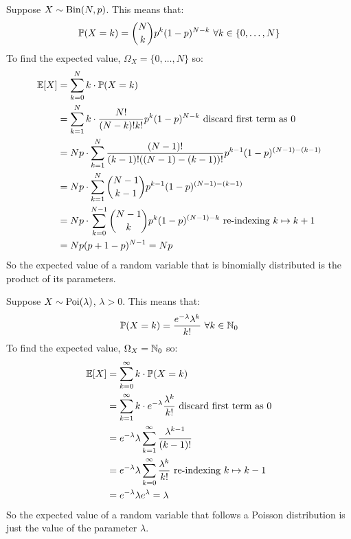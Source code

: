 \documentclass[../main.tex]{subfiles}
\begin{document}
\begin{example}
  \label{binomialExpectation}
  Suppose $X \sim \binomial(N, p)$.
  This means that:
  \[
    \P(X = k) = \binom{N}{k}p^{k}(1-p)^{N-k}\ \forall k \in \{0, \ldots, N\}
  \]
  To find the expected value, $\Omega_X = \{0, \ldots, N\}$ so:
  \begin{align*}
    \E[X] &= \sum_{k = 0}^{N} k \cdot \P(X = k) \\
          &= \sum_{k = 1}^{N} k \cdot \frac{N!}{(N - k)!k!} p^{k}(1 - p)^{N - k}  \text{ discard first term as 0} \\
          &= Np \cdot \sum_{k = 1}^{N} \frac{(N - 1)!}{(k - 1)!((N - 1) - (k - 1))!}p^{k - 1}(1 - p)^{(N - 1) - (k - 1)} \\
          &= Np \cdot \sum_{k = 1}^{N} \binom{N-1}{k - 1}p^{k - 1}(1 - p)^{(N - 1) - (k - 1)} \\
          &= Np \cdot \sum_{k = 0}^{N - 1} \binom{N - 1}{k}p^{k}(1 - p)^{(N - 1) - k} \text{ re-indexing $k \mapsto k + 1$}\\
          &= Np (p + 1 - p)^{N - 1} = Np
  \end{align*}
  So the expected value of a random variable that is binomially distributed is the product of its parameters.
\end{example}
\begin{example}
  \label{poissonExpectation}
  Suppose $X \sim \poisson(\lambda)$, $\lambda > 0$.
  This means that:
  \[
    \P(X = k) = \frac{e^{-\lambda} \lambda^{k}}{k!}\ \forall k \in \N_0
  \]
  To find the expected value, $\Omega_X = \N_0$ so:
  \begin{align*}
    \E[X] &= \sum_{k = 0}^{\infty} k \cdot \P(X = k) \\
          &= \sum_{k = 1}^{\infty} k \cdot e^{-\lambda} \frac{\lambda^{k}}{k!} \text{ discard first term as 0} \\
          &= e^{-\lambda} \lambda \sum_{k = 1}^{\infty} \frac{\lambda^{k - 1}}{(k - 1)!} \\
          &= e^{-\lambda} \lambda \sum_{k = 0}^{\infty} \frac{\lambda^{k}}{k!} \text{ re-indexing $k \mapsto k - 1$} \\
          &= e^{-\lambda} \lambda e^{\lambda} = \lambda
  \end{align*}
  So the expected value of a random variable that follows a Poisson distribution is just the value of the parameter $\lambda$.
\end{example}
\end{document}
